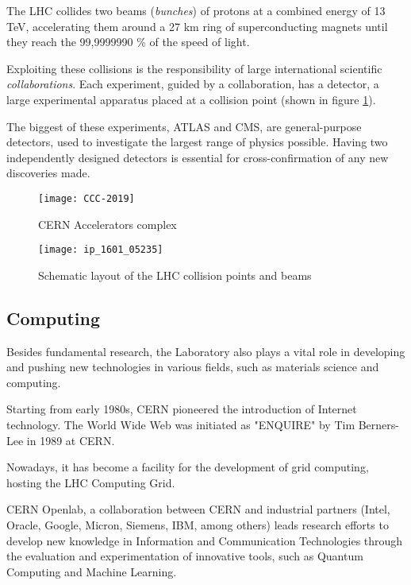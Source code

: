 The LHC collides two beams (\textit{bunches}) of protons at a combined energy of 13 TeV, accelerating them around a 27 km ring of superconducting magnets until they reach the 99,9999990 \% of the speed of light.

Exploiting these collisions is the responsibility of large international scientific \textit{collaborations}. Each experiment, guided by a collaboration, has a detector, a large experimental apparatus placed at a collision point (shown in figure \ref{fig:cern_complex}).

The biggest of these experiments, ATLAS and CMS, are general-purpose detectors, used to investigate the largest range of physics possible. Having two independently designed detectors is essential for cross-confirmation of any new discoveries made.

\begin{figure}
	\centerline{
		\texttt{[image: CCC-2019]}}
	\caption{CERN Accelerators complex \cite{Mobs:2684277}}
	\label{fig:cern_complex}
\end{figure}

\begin{figure}
	\centerline{
		\texttt{[image: ip\_1601\_05235]}}
	\caption{Schematic layout of the LHC collision points and beams \cite{Herr:1982430}}
	\label{fig:ip}
\end{figure}

\subsection{Computing}

Besides fundamental research, the Laboratory also plays a vital role in developing and pushing new technologies in various fields, such as materials science and computing.

Starting from early 1980s, CERN pioneered the introduction of Internet technology. The World Wide Web was initiated as "ENQUIRE" by Tim Berners-Lee in 1989 at CERN.

Nowadays, it has become a facility for the development of grid computing, hosting the LHC Computing Grid.

CERN Openlab, a collaboration between CERN and industrial partners (Intel, Oracle, Google, Micron, Siemens, IBM, among others) leads research efforts to develop new knowledge in Information and Communication Technologies through the evaluation and experimentation of innovative tools, such as Quantum Computing and Machine Learning.

